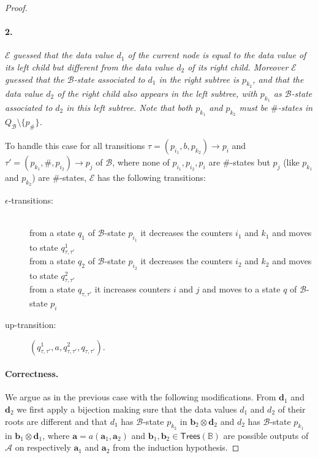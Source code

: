 \documentclass{CSML}
\newcommand\ra{\ensuremath{\rightarrow}}
\newcommand\B{\mathbb{B}}
\newcommand\Aa{\mathcal{A}}
\newcommand\Ba{\mathcal{B}}
\newcommand\Ea{\mathcal{E}}
\newcommand\Trees{\mathsf{Trees}}
\newcommand\atree{\boldsymbol{a}}
\newcommand\btree{\boldsymbol{b}}
\newcommand\dtree{\boldsymbol{d}}
\begin{document}
\begin{proof}
\paragraph{\bf 2.}  \emph{$\Ea$ guessed that the data value $d_1$ of
  the current node is equal to the data value of its left child but different
  from the data value $d_2$ of its right child. 
  Moreover $\Ea$ guessed that the $\Ba$-state associated to $d_1$ in the right
  subtree is $p_{k_2}$, and that the data value $d_2$ of the right child also appears in the left subtree, with $p_{k_1}$ as $\Ba$-state associated to $d_2$ in this left subtree.
  Note that both $p_{k_1}$ and $p_{k_2}$ must be $\#$-states in $Q_\Ba \setminus \{ p_\#\}$.}

\noindent
To handle this case for all transitions $\tau=(p_{i_1},b,p_{k_2}) \ra p_{i}$
and $\tau'=(p_{k_1},\#,p_{i_2})\ra p_j$ of
$\Ba$, where none of $p_{i_1},p_{i_2}, p_i$ are $\#$-states but
$p_j$ (like $p_{k_1}$ and $p_{k_2}$) are $\#$-states, 
$\Ea$ has the following transitions:
\begin{description}
\item[\rm $\epsilon$-transitions:] \quad\\
from a state $q_1$ of $\Ba$-state $p_{i_1}$
it decreases the counters $i_1$ and $k_1$ 
and moves to state $q_{\tau,\tau'}^1$\\
from a state $q_2$ of $\Ba$-state $p_{i_2}$ 
it decreases the counters $i_2$ and $k_2$ 
and moves to state $q_{\tau,\tau'}^2$\\
from a state $q_{\tau,\tau'}$ 
it increases counters $i$ and $j$ 
and moves to a state $q$ of $\Ba$-state $p_i$

\item[\rm up-transition:]
$(q_{\tau,\tau'}^1,a,q_{\tau,\tau'}^2,q_{\tau,\tau'})$.
\end{description}

\paragraph{\bf Correctness.}  We argue as in the previous case with the following modifications.
From $\dtree_1$ and $\dtree_2$ we first apply a bijection making sure that the
data values $d_1$ and $d_2$ of their roots are different and that $d_1$ has
$\Ba$-state $p_{k_2}$ in $\btree_2 \otimes \dtree_2$ 
and $d_2$ has $\Ba$-state $p_{k_1}$ in $\btree_1 \otimes \dtree_1$,
where $\atree = a(\atree_1,\atree_2)$ and 
$\btree_1, \btree_2 \in \Trees(\B)$ are possible outputs of $\Aa$ 
on respectively $\atree_1$ and $\atree_2$ from the induction hypothesis.


\end{proof}
\end{document}
